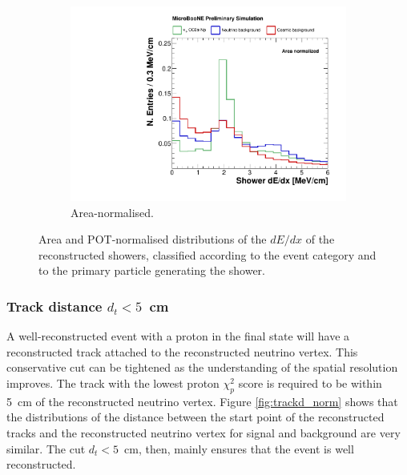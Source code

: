 \begin{figure}[htbp]
\begin{subfigure}{0.49\textwidth}
    \includegraphics[width=\linewidth]{figures/h_shower_dedx_cali_norm.pdf}
    \caption{Area-normalised.} \label{fig:dedx_norm}
  \end{subfigure}
  \caption{Area and POT-normalised distributions of the $dE/dx$ of the reconstructed showers, classified according to the event category and to the primary particle generating the shower.}\label{fig:dedx_datamc}
\end{figure}

\subsubsection*{Track distance $d_{t} < 5$~cm}
A well-reconstructed event with a proton in the final state will have a reconstructed track attached to the reconstructed neutrino vertex. This conservative cut can be tightened as the understanding of the spatial resolution improves. The track with the lowest proton $\chi_{p}^2$ score is required to be within 5~cm of the reconstructed neutrino vertex.
Figure \ref{fig:trackd_norm} shows that the distributions of the distance between the start point of the reconstructed tracks and the reconstructed neutrino vertex for signal and background are very similar. The cut $d_{t} < 5$~cm, then, mainly ensures that the event is well reconstructed. 


